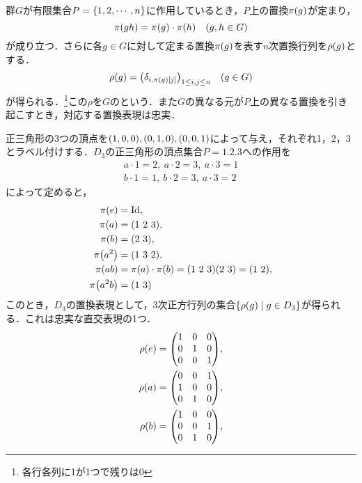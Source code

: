 \documentclass[main]{subfiles}
\begin{document}
		\begin{ex}
			群$G$が有限集合$P=\qty{1,2,\cdots,n}$に作用しているとき，$P$上の置換$\pi\qty(g)$が定まり，
			\[\pi\qty(gh)=\pi\qty(g)\cdot\pi\qty(h)\quad\qty(g,h\in G)\]
			が成り立つ．さらに各$g\in G$に対して定まる置換$\pi\qty(g)$を表す$n$次置換行列を$\rho\qty(g)$とする．
			\[\rho\qty(g)=\qty(\delta_{i,\pi\qty(g)\qty[j]})_{1\leq i,j\leq n}\quad\qty(g\in G)\]
			が得られる．\footnote{各行各列に1が1つで残りは0}この$\rho$を$G$のという．また$G$の異なる元が$P$上の異なる置換を引き起こすとき，対応する置換表現は忠実．
		\end{ex}
		\begin{ex}\label{ex:rho_ex5}
			正三角形の3つの頂点を$\qty(1,0,0),\qty(0,1,0),\qty(0,0,1)$によって与え，それぞれ1，2，3とラベル付けする．$D_3$の正三角形の頂点集合$P=\qty{1,2,3}$への作用を
			\begin{align*}
				a\cdot 1=2,\ a\cdot 2=3,\ a\cdot 3=1 \\
				b\cdot 1=1,\ b\cdot 2=3,\ a\cdot 3=2
			\end{align*}
			によって定めると，
			\begin{align*}
				\pi\qty(e)    & =\text{Id},                                                    \\
				\pi\qty(a)    & =\qty(1\ 2\ 3),                                                \\
				\pi\qty(b)    & =\qty(2\ 3),                                                   \\
				\pi\qty(a^2)  & =\qty(1\ 3\ 2),                                                \\
				\pi\qty(ab)   & =\pi\qty(a)\cdot\pi\qty(b)=\qty(1\ 2\ 3)\qty(2\ 3)=\qty(1\ 2), \\
				\pi\qty(a^2b) & =\qty(1\ 3)
			\end{align*}
			このとき，$D_3$の置換表現として，3次正方行列の集合$\qty{\rho\qty(g)\mid g\in D_3}$が得られる．これは忠実な直交表現の1つ．
			\begin{align*}
				\rho\qty(e)    & =\mqty(1                        & 0 & 0 \\0&1&0\\0&0&1),\\
				\rho\qty(a)    & =\mqty(0                        & 0 & 1 \\1&0&0\\0&1&0),\\
				\rho\qty(b)    & =\mqty(1                        & 0 & 0 \\0&0&1\\0&1&0),\\

\end{align*}
\end{ex}
\end{document}
